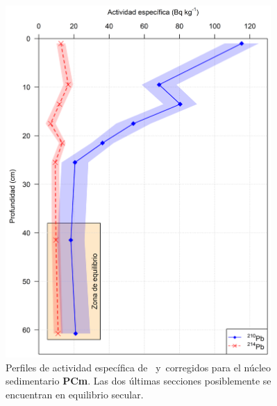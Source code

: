 \begin{figure}
\centering
\includegraphics[width=0.9\textwidth]{Imagenes/Act_210Pb_214Pb_PCm.png}
\caption{Perfiles de actividad específica de \PbCero\, y \PbCuatro\,corregidos para el núcleo sedimentario \textbf{PCm}. Las dos últimas secciones posiblemente se encuentran en equilibrio secular.}\label{Fig-PCm-Comp}
\end{figure}
